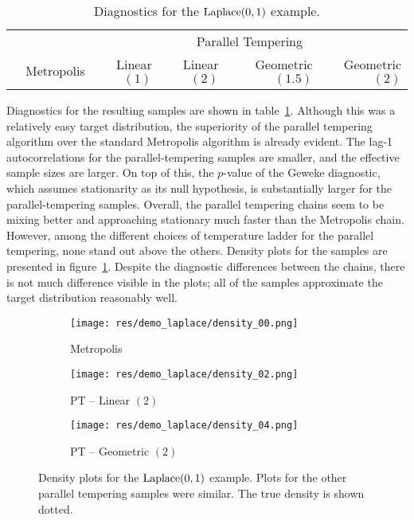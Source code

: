     \begin{table}[ht]
    \begin{tabular}{lrrrrr}
    \toprule
    & & \multicolumn{4}{c}{Parallel Tempering} \\
    \cmidrule(l){3-6}
    & Metropolis & Linear $(1)$ & Linear $(2)$ 
    & Geometric $(1.5)$ & Geometric $(2)$ \\
    \midrule
    
    \bottomrule
    \end{tabular}
    \caption{
    Diagnostics for the $\operatorname{Laplace}(0, 1)$ example.
    }
    \label{tab:laplace_diag}
    \end{table}

Diagnostics for the resulting samples are shown in 
table~\ref{tab:laplace_diag}.
Although this was a relatively easy target distribution,
the superiority of the parallel tempering algorithm over the standard
Metropolis algorithm is already evident.
The lag-1 autocorrelations for the parallel-tempering samples are smaller,
and the effective sample sizes are larger.
On top of this, the $p$-value of the Geweke diagnostic, which assumes
stationarity as its null hypothesis, is substantially larger for the
parallel-tempering samples.
Overall, the parallel tempering chains seem to be mixing better and approaching
stationary much faster than the Metropolis chain.
However, among the different choices of temperature ladder for the
parallel tempering, none stand out above the others.
Density plots for the samples are presented in figure~\ref{fig:laplace_dens}.
Despite the diagnostic differences between the chains, there is not much
difference visible in the plots; all of the samples approximate the target
distribution reasonably well.

    \begin{figure}[h]
    \begin{subfigure}[b]{0.3\textwidth}
        \texttt{[image: res/demo\_laplace/density\_00.png]}
        \caption{Metropolis}
    \end{subfigure}
    \begin{subfigure}[b]{0.3\textwidth}
        \texttt{[image: res/demo\_laplace/density\_02.png]}
        \caption{PT -- Linear $(2)$}
    \end{subfigure}
    \begin{subfigure}[b]{0.3\textwidth}
        \texttt{[image: res/demo\_laplace/density\_04.png]}
        \caption{PT -- Geometric $(2)$}
    \end{subfigure}
    \caption{
    Density plots for the $\operatorname{Laplace}(0, 1)$ example.
    Plots for the other parallel tempering samples were similar.
    The true density is shown dotted.
    }
    \label{fig:laplace_dens}
    \end{figure}

